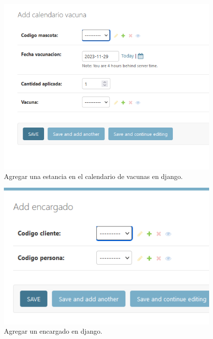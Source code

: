 \documentclass[
  12pt,
  hidelinks,
  a4paper,
  headings=standardclasses,
  headings=big,
  spanish
]{scrartcl}
\begin{document}
\begin{figure}[H]
  \centering
  \includegraphics[width=\textwidth]{django-calendario-add.png}
  \caption{Agregar una estancia en el calendario de vacunas en django.}
\end{figure}

\begin{figure}[H]
  \centering
  \includegraphics[width=\textwidth]{django-encargado-add.png}
  \caption{Agregar un encargado en django.}
\end{figure}
\end{document}
